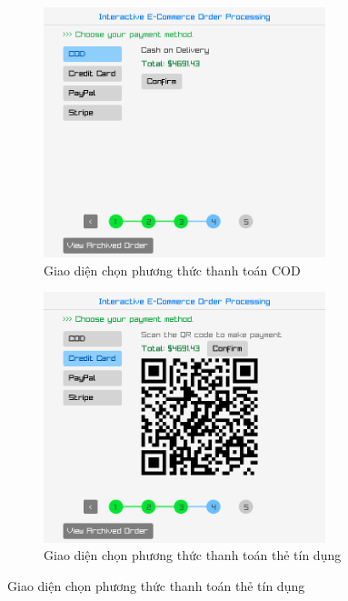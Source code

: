 \documentclass[a4paper,12pt]{report}
\begin{document}
\begin{figure}[!ht]
  \centering
  \begin{subfigure}{0.46\textwidth}
    \centering
    \includegraphics[width=0.9\textwidth]{../assets/screenshots/gui/payment_cod.png}
    \caption{Giao diện chọn phương thức thanh toán COD}
  \end{subfigure}
  \hfill
  \begin{subfigure}{0.46\textwidth}
    \centering
    \includegraphics[width=0.9\textwidth]{../assets/screenshots/gui/payment_creditcard.png}
    \caption{Giao diện chọn phương thức thanh toán thẻ tín dụng}
  \end{subfigure}

\end{figure}
\end{document}
